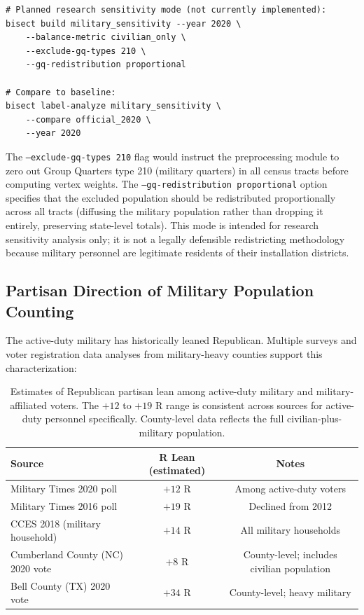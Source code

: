 \begin{verbatim}
# Planned research sensitivity mode (not currently implemented):
bisect build military_sensitivity --year 2020 \
    --balance-metric civilian_only \
    --exclude-gq-types 210 \
    --gq-redistribution proportional

# Compare to baseline:
bisect label-analyze military_sensitivity \
    --compare official_2020 \
    --year 2020
\end{verbatim}

The \texttt{--exclude-gq-types 210} flag would instruct the preprocessing module to zero out Group Quarters type 210 (military quarters) in all census tracts before computing vertex weights. The \texttt{--gq-redistribution proportional} option specifies that the excluded population should be redistributed proportionally across all tracts (diffusing the military population rather than dropping it entirely, preserving state-level totals). This mode is intended for research sensitivity analysis only; it is not a legally defensible redistricting methodology because military personnel are legitimate residents of their installation districts.

\subsection{Partisan Direction of Military Population Counting}

The active-duty military has historically leaned Republican. Multiple surveys and voter registration data analyses from military-heavy counties support this characterization:

\begin{table}[h]
\centering
\begin{tabular}{lcc}
\toprule
\textbf{Source} & \textbf{R Lean (estimated)} & \textbf{Notes} \\
\midrule
Military Times 2020 poll & $+12$ R & Among active-duty voters \\
Military Times 2016 poll & $+19$ R & Declined from 2012 \\
CCES 2018 (military household) & $+14$ R & All military households \\
Cumberland County (NC) 2020 vote & $+8$ R & County-level; includes civilian population \\
Bell County (TX) 2020 vote & $+34$ R & County-level; heavy military \\
\bottomrule
\end{tabular}
\caption{Estimates of Republican partisan lean among active-duty military and military-affiliated voters. The $+12$ to $+19$ R range is consistent across sources for active-duty personnel specifically. County-level data reflects the full civilian-plus-military population.}
\label{tab:partisan-lean}
\end{table}

